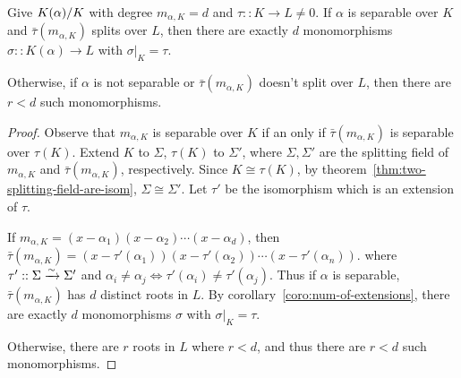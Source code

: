 \begin{prop} \label{prop:separable-and-split-have-most-embeddings}
  Give ${K(\alpha)}/{K}$ with degree $m_{\alpha, K} = d$ and $\tau :: K \to L \neq 0$.
  If $\alpha$ is separable over $K$ and $\bar\tau(m_{\alpha, K})$ splits over $L$, then
  there are exactly $d$ monomorphisms $\sigma :: K(\alpha) \to L$ with $\sigma\big|_K = \tau$.

  Otherwise, if $\alpha$ is not separable or $\bar\tau(m_{\alpha, K})$ doesn't split over $L$,
  then there are $r < d$ such monomorphisms.

  \begin{proof}
    Observe that $m_{\alpha, K}$ is separable over $K$ if an only if $\bar\tau(m_{\alpha, K})$ is separable over $\tau(K)$.
    Extend $K$ to $\Sigma$, $\tau(K)$ to $\Sigma'$, where $\Sigma, \Sigma'$ are the splitting
    field of $m_{\alpha, K}$ and $\bar\tau(m_{\alpha, K})$, respectively.
    Since $K \cong \tau(K)$, by theorem~\ref{thm:two-splitting-field-are-isom}, $\Sigma \cong \Sigma'$.
    Let $\tau'$ be the isomorphism which is an extension of $\tau$.

    If $m_{\alpha, K} = (x - \alpha_1) (x - \alpha_2) \cdots (x - \alpha_d)$, then
    $\bar\tau(m_{\alpha, K}) = (x - \tau'(\alpha_1)) (x - \tau'(\alpha_2)) \cdots (x - \tau'(\alpha_n))$.
    where $\tau' :: \Sigma \xrightarrow{\sim} \Sigma'$ and $\alpha_i \neq \alpha_j \iff \tau'(\alpha_i) \neq \tau'(\alpha_j)$.
    Thus if $\alpha$ is separable, $\bar\tau(m_{\alpha, K})$ has $d$ distinct roots in $L$.
    By corollary~\ref{coro:num-of-extensions}, there are exactly $d$ monomorphisms $\sigma$ with $\sigma\big|_K = \tau$.

    Otherwise, there are $r$ roots in $L$ where $r < d$, and thus there are $r < d$ such monomorphisms.
  \end{proof}
\end{prop}

